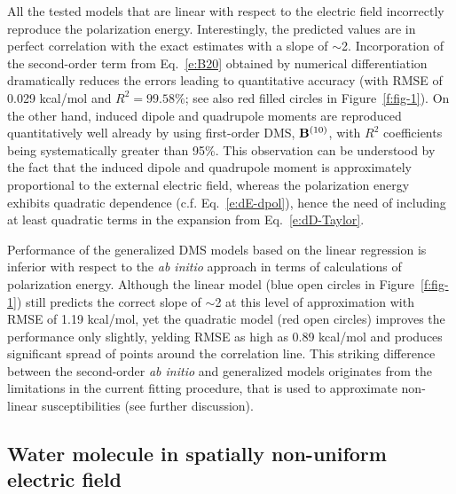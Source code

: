 \documentclass[aip,amsmath,amssymb,reprint,floatfix]{revtex4-1}
\begin{document}
%
All the tested models that are linear with respect to the electric field 
incorrectly reproduce the polarization energy.
Interestingly, the predicted values are in perfect correlation with the exact estimates with a slope of $\sim$2.
Incorporation of the second\hyp{}order term from Eq.~\eqref{e:B20} 
obtained by numerical differentiation dramatically reduces the errors
leading to quantitative accuracy (with RMSE of 0.029 kcal/mol and $R^2=99.58\%$;
see also red filled circles in Figure~\ref{f:fig-1}). On the other hand,
induced dipole and quadrupole moments are reproduced quantitatively well already by
using first\hyp{}order DMS, ${\bf B}^{(10)}$, with $R^2$ coefficients being systematically
greater than 95\%. This observation can be understood by the fact that the induced dipole
and quadrupole moment is approximately proportional to the external electric field, whereas the polarization
energy exhibits quadratic dependence (c.f. Eq.~\eqref{e:dE-dpol}), hence the need of including at least
quadratic terms in the expansion from Eq.~\eqref{e:dD-Taylor}.

Performance of the generalized DMS models based on the linear regression 
is inferior with respect to the \emph{ab initio} approach in terms of calculations of polarization energy.
Although the linear model (blue open circles in Figure~\ref{f:fig-1})
still predicts the correct slope of $\sim$2 at this level of approximation with RMSE of 1.19 kcal/mol,
yet the quadratic model (red open circles)
improves the performance only slightly, yelding RMSE as high as 0.89 kcal/mol
and produces significant spread of points around the correlation line. This striking difference
between the second\hyp{}order \emph{ab initio} and generalized models originates from the limitations
in the current fitting procedure, that is used to approximate non\hyp{}linear susceptibilities (see further discussion).

\subsection{\label{ss:42}Water molecule in spatially non\hyp{}uniform electric field}
\end{document}
